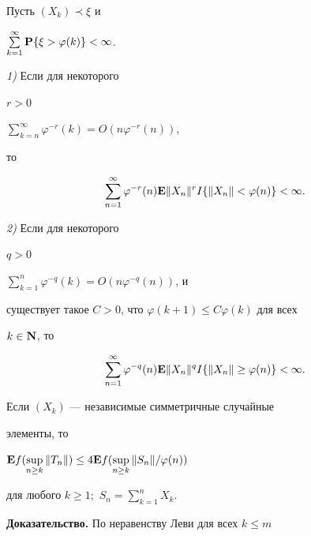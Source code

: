 \begin{lem} Пусть $(X_{k} )\prec \xi $ и


$\sum\limits^{\infty }_{k=1} \bold P \{\xi >\varphi (k)\}< \infty $.





{\em 1)} Если для некоторого


$r>0\;$


$\sum\limits^{\infty }_{k=n} \varphi ^{-r} (k)= O(n\varphi ^{-r} (n))$,


то


$$


\sum^{\infty }_{n=1} \varphi ^{-r} (n)\bold E


\| X_{n} \|^{r} I\{\| X_{n} \| <\varphi (n)\}< \infty.


$$





{\em 2)} Если для некоторого


$q>0\;$


$\sum\limits^{n}_{k=1} \varphi ^{-q} (k)= O(n\varphi ^{-q} (n))$, и


существует такое $C>0$, что $\varphi (k+1)\le C\varphi (k)$ для всех


$k\in \bold N$, то


$$


\sum^{\infty }_{n=1} \varphi ^{-q} (n)\bold E


\| X_{n} \|^{q} I\{\| X_{n} \|


\ge \varphi (n)\}< \infty.


$$


\end{lem}





\begin{lem} Если $(X_{k} )$ --- независимые симметричные случайные


элементы, то


$\bold E f(\sup\limits_{n\ge k} \| T_{n} \|)\le


4\bold E f(\sup\limits_{n\ge k} \| S_{n} \| /\varphi (n))$


для любого $k\ge 1;$ $S_n=\sum\limits^n_{k=1}X_k$.


\end{lem}





{\bf Доказательство.} По неравенству Леви для всех $k\le m$


